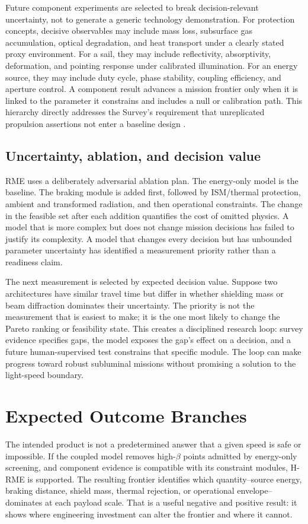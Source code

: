 \documentclass[conference]{../../../../Conference-LaTeX-template_10-17-19/IEEEtran}
\begin{document}
Future component experiments are selected to break decision-relevant uncertainty, not to generate a generic technology demonstration. For protection concepts, decisive observables may include mass loss, subsurface gas accumulation, optical degradation, and heat transport under a clearly stated proxy environment. For a sail, they may include reflectivity, absorptivity, deformation, and pointing response under calibrated illumination. For an energy source, they may include duty cycle, phase stability, coupling efficiency, and aperture control. A component result advances a mission frontier only when it is linked to the parameter it constrains and includes a null or calibration path. This hierarchy directly addresses the Survey's requirement that unreplicated propulsion assertions not enter a baseline design \cite{neunzig2021,millis2005}.

\subsection{Uncertainty, ablation, and decision value}
RME uses a deliberately adversarial ablation plan. The energy-only model is the baseline. The braking module is added first, followed by ISM/thermal protection, ambient and transformed radiation, and then operational constraints. The change in the feasible set after each addition quantifies the cost of omitted physics. A model that is more complex but does not change mission decisions has failed to justify its complexity. A model that changes every decision but has unbounded parameter uncertainty has identified a measurement priority rather than a readiness claim.

The next measurement is selected by expected decision value. Suppose two architectures have similar travel time but differ in whether shielding mass or beam diffraction dominates their uncertainty. The priority is not the measurement that is easiest to make; it is the one most likely to change the Pareto ranking or feasibility state. This creates a disciplined research loop: survey evidence specifies gaps, the model exposes the gap's effect on a decision, and a future human-supervised test constrains that specific module. The loop can make progress toward robust subluminal missions without promising a solution to the light-speed boundary.
\section{Expected Outcome Branches}
The intended product is not a predetermined answer that a given speed is safe or impossible. If the coupled model removes high-$\beta$ points admitted by energy-only screening, and component evidence is compatible with its constraint modules, H-RME is supported. The resulting frontier identifies which quantity--source energy, braking distance, shield mass, thermal rejection, or operational envelope--dominates at each payload scale. That is a useful negative and positive result: it shows where engineering investment can alter the frontier and where it cannot.
\end{document}
